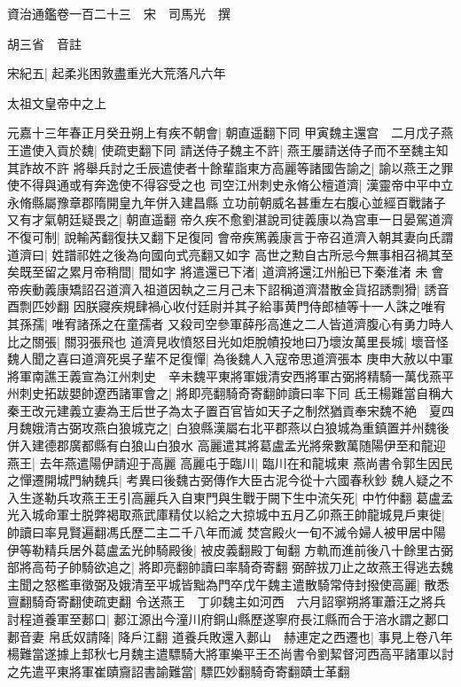 資治通鑑卷一百二十三　宋　司馬光　撰

胡三省　音註

宋紀五|{
	起柔兆困敦盡重光大荒落凡六年}


太祖文皇帝中之上

元嘉十三年春正月癸丑朔上有疾不朝會|{
	朝直遥翻下同}
甲寅魏主還宫　二月戊子燕王遣使入貢於魏|{
	使疏吏翻下同}
請送侍子魏主不許|{
	燕王屢請送侍子而不至魏主知其詐故不許}
將舉兵討之壬辰遣使者十餘輩詣東方高麗等諸國告諭之|{
	諭以燕王之罪使不得與通或有奔逸使不得容受之也}
司空江州刺史永脩公檀道濟|{
	漢靈帝中平中立永脩縣屬豫章郡隋開皇九年併入建昌縣}
立功前朝威名甚重左右腹心並經百戰諸子又有才氣朝廷疑畏之|{
	朝直遥翻}
帝久疾不愈劉湛說司徒義康以為宫車一日晏駕道濟不復可制|{
	說輸芮翻復扶又翻下足復同}
會帝疾篤義康言于帝召道濟入朝其妻向氏謂道濟曰|{
	姓譜祁姓之後為向國向式亮翻又如字}
高世之勲自古所忌今無事相召禍其至矣既至留之累月帝稍間|{
	間如字}
將遣還已下渚|{
	道濟將還江州船已下秦淮渚}
未會帝疾動義康矯詔召道濟入祖道因執之三月己未下詔稱道濟潜散金貨招誘剽猾|{
	誘音酉剽匹妙翻}
因朕寢疾規肆禍心收付廷尉并其子給事黄門侍郎植等十一人誅之唯宥其孫孺|{
	唯宥諸孫之在童孺者}
又殺司空參軍薛彤高進之二人皆道濟腹心有勇力時人比之關張|{
	關羽張飛也}
道濟見收憤怒目光如炬脫幘投地曰乃壞汝萬里長城|{
	壞音怪}
魏人聞之喜曰道濟死吳子輩不足復憚|{
	為後魏人入寇帝思道濟張本}
庚申大赦以中軍將軍南譙王義宣為江州刺史　辛未魏平東將軍娥清安西將軍古弼將精騎一萬伐燕平州刺史拓跋嬰帥遼西諸軍會之|{
	將即亮翻騎奇寄翻帥讀曰率下同}
氐王楊難當自稱大秦王改元建義立妻為王后世子為太子置百官皆如天子之制然猶貢奉宋魏不絶　夏四月魏娥清古弼攻燕白狼城克之|{
	白狼縣漢屬右北平郡燕以白狼城為重鎮置并州魏後併入建德郡廣都縣有白狼山白狼水}
高麗遣其將葛盧孟光將衆數萬随陽伊至和龍迎燕王|{
	去年燕遣陽伊請迎于高麗}
高麗屯于臨川|{
	臨川在和龍城東}
燕尚書令郭生因民之憚遷開城門納魏兵|{
	考異曰後魏古弼傳作大臣古泥今從十六國春秋鈔}
魏人疑之不入生遂勒兵攻燕王王引高麗兵入自東門與生戰于闕下生中流矢死|{
	中竹仲翻}
葛盧孟光入城命軍士脱弊褐取燕武庫精仗以給之大掠城中五月乙卯燕王帥龍城見戶東徙|{
	帥讀曰率見賢遍翻馮氏歷二主二千八年而滅}
焚宫殿火一旬不滅令婦人被甲居中陽伊等勒精兵居外葛盧孟光帥騎殿後|{
	被皮義翻殿丁甸翻}
方軌而進前後八十餘里古弼部將高苟子帥騎欲追之|{
	將即亮翻帥讀曰率騎奇寄翻}
弼醉拔刀止之故燕王得逃去魏主聞之怒檻車徵弼及娥清至平城皆黜為門卒戊午魏主遣散騎常侍封撥使高麗|{
	散悉亶翻騎奇寄翻使疏吏翻}
令送燕王　丁卯魏主如河西　六月詔寧朔將軍蕭汪之將兵討程道養軍至郪口|{
	郪江源出今潼川府銅山縣歷遂寧府長江縣而合于涪水謂之郪口郪音妻}
帛氐奴請降|{
	降戶江翻}
道養兵敗還入郪山　赫連定之西遷也|{
	事見上卷八年}
楊難當遂據上邽秋七月魏主遣驃騎大將軍樂平王丕尚書令劉絜督河西高平諸軍以討之先遣平東將軍崔賾齎詔書諭難當|{
	驃匹妙翻騎奇寄翻賾士革翻}

